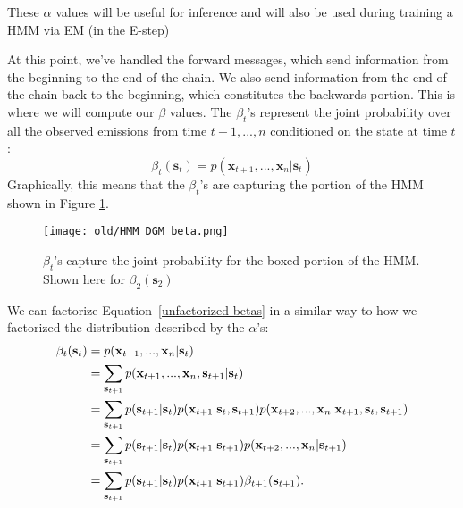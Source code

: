 \begin{warning}
  These $\alpha$ values will be useful for inference and will also be used during training a HMM via EM (in the E-step)
\end{warning}

At this point, we've handled the forward messages, which send information from the beginning to the end of the chain. We also send information from the end of the chain back to the beginning, which constitutes the backwards portion. This is where we will compute our $\beta$ values.
%
The $\beta_t$'s represent the joint probability over all the observed emissions from time $t+1, ..., n$ conditioned on the state at time $t$:
\begin{equation} \label{unfactorized-betas}
	\beta_t(\textbf{s}_t) = p(\textbf{x}_{t+1}, ..., \textbf{x}_n | \textbf{s}_t)
\end{equation}
Graphically, this means that the $\beta_t$'s are capturing the portion of the HMM shown in Figure \ref{fig:HMM-DGM-beta}.
%
\begin{figure}[b!]
    \centering
    \texttt{[image: old/HMM\_DGM\_beta.png]}
    \caption{$\beta_t$'s capture the joint probability for the boxed portion of the HMM. Shown here for $\beta_2(\mathbf{s}_2)$} 
    \label{fig:HMM-DGM-beta}
\end{figure}



We can factorize Equation~\ref{unfactorized-betas} in a similar way to how we factorized the distribution described by the $\alpha$'s:
%
\begin{align}
  \beta_t(\textbf{s}_t) &= p(\textbf{x}_{t+1}, ..., \textbf{x}_n | \textbf{s}_t) \notag \\
&=\sum_{\textbf{s}_{t+1}} p(\textbf{x}_{t+1}, ..., \textbf{x}_n, \textbf{s}_{t+1} | \textbf{s}_t) 
 \label{eq:dcp1hmm} \\
                        &= \sum_{\textbf{s}_{t+1}} p(\textbf{s}_{t+1} | \textbf{s}_t) p(\textbf{x}_{t+1} | \textbf{s}_t, \textbf{s}_{t+1}) p(\textbf{x}_{t+2}, ..., \textbf{x}_n | \textbf{x}_{t+1}, \textbf{s}_t,\textbf{s}_{t+1}) \label{eq:dcp2hmm} \\
&  = \sum_{\textbf{s}_{t+1}} p(\textbf{s}_{t+1} | \textbf{s}_t) p(\textbf{x}_{t+1} | \textbf{s}_{t+1})
p(\textbf{x}_{t+2}, ..., \textbf{x}_n | \textbf{s}_{t+1})
  \label{eq:dcp3hmm}\\
	&= \sum_{\textbf{s}_{t+1}} p(\textbf{s}_{t+1} | \textbf{s}_t) p(\textbf{x}_{t+1} | \textbf{s}_{t+1}) \beta_{t+1}(\textbf{s}_{t+1}). \label{eq:dcp4hmm}
\end{align}

